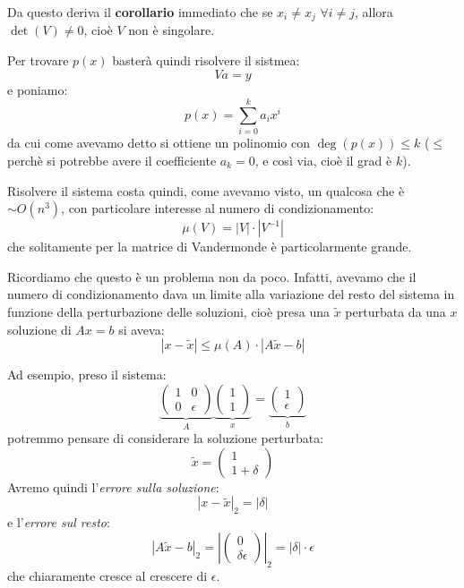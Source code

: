 \documentclass[a4paper,11pt]{article}
\begin{document}
Da questo deriva il \textbf{corollario} immediato che se $x_i \neq x_j$ $\forall i \neq j$, allora $\det(V) \neq 0$, cioè $V$ non è singolare.

\par\smallskip

Per trovare $p(x)$ basterà quindi risolvere il sistmea:
$$
Va = y
$$
e poniamo:
$$
p(x) = \sum_{i = 0}^k a_i x^i
$$
da cui come avevamo detto si ottiene un polinomio con $\deg(p(x)) \leq k$ ($\leq$ perchè si potrebbe avere il coefficiente $a_k = 0$, e così via, cioè il grad è  $k$).

Risolvere il sistema costa quindi, come avevamo visto, un qualcosa che è $\sim O(n^3)$, con particolare interesse al numero di condizionamento:
$$
\mu(V) = |V| \cdot |V^{-1}|
$$
che solitamente per la matrice di Vandermonde è particolarmente grande.

\par\smallskip

Ricordiamo che questo è un problema non da poco.
Infatti, avevamo che il numero di condizionamento dava un limite alla variazione del resto del sistema in funzione della perturbazione delle soluzioni, cioè presa una $\tilde{x}$ perturbata da una $x$ soluzione di $Ax = b$ si aveva:
$$
|x - \tilde{x}| \leq \mu(A) \cdot |A \tilde{x} - b|
$$

Ad esempio, preso il sistema:
$$
\underbrace{
\begin{pmatrix}
	1 & 0 \\ 
	0 & \epsilon
\end{pmatrix}
}_A
\underbrace{
\begin{pmatrix}
	1 \\ 1
\end{pmatrix}
}_x
=
\underbrace{
\begin{pmatrix}
	1 \\ \epsilon
\end{pmatrix}
}_b
$$
potremmo pensare di considerare la soluzione perturbata:
$$
\tilde{x} =
\begin{pmatrix}
	1 \\ 1 + \delta
\end{pmatrix}
$$
Avremo quindi l'\textit{errore sulla soluzione}:
$$
|x - \tilde{x}|_2 = |\delta|
$$
e l'\textit{errore sul resto}:
$$
|A \tilde{x} - b|_2 = \left| \begin{pmatrix}
	0 \\ \delta \epsilon
\end{pmatrix} \right|_2
= |\delta| \cdot \epsilon
$$
che chiaramente cresce al crescere di $\epsilon$.
\end{document}
